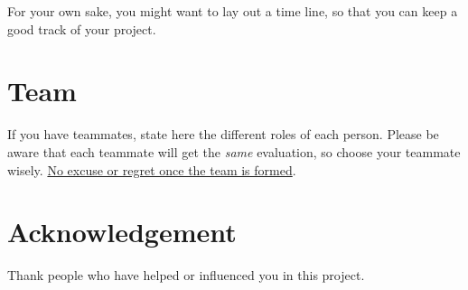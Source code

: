 \documentclass{article}
\begin{document}
For your own sake, you might want to lay out a time line, so that you can keep a good track of your project.

\section{Team}
If you have teammates, state here the different roles of each person. Please be aware that each teammate will get the \emph{same} evaluation, so choose your teammate wisely. \uline{No excuse or regret once the team is formed}.


\section*{Acknowledgement}
Thank people who have helped or influenced you in this project.



\end{document}
